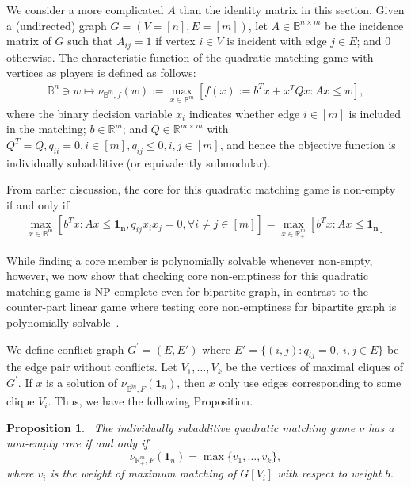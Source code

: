 \documentclass[11pt]{article}\usepackage[]{graphicx}\usepackage[]{xcolor}
\newtheorem{prop}{Proposition}
\begin{document}
We consider a more complicated $A$ than the identity matrix in this section. Given a (undirected) graph $G=(V=[n], E=[m])$, let $A \in \mathbb{B}^{n\times m}$ be the incidence matrix of $G$ such that $A_{ij}=1$ if vertex $i\in V$ is incident with edge $j\in E$; and 0 otherwise. The characteristic function of the quadratic matching game with vertices as players is defined as follows:
\begin{eqnarray*}
\mathbb{B}^n\ni w\mapsto \nu_{\mathbb{B}^m,f}(w):=\max_{x \in \mathbb{B}^m} \left[f(x):=b^T x+x^TQx: Ax\le w\right],
\end{eqnarray*}
where the binary decision variable $x_i$ indicates whether edge $i\in [m]$ is included in the matching; $b\in\mathbb{R}^m$; and $Q\in\mathbb{R}^{m\times m}$ with $Q^T=Q, q_{ii}=0, i\in [m], q_{ij}\le 0, i, j\in [m]$, and hence the objective function is individually subadditive (or equivalently submodular).

From earlier discussion, the core for this quadratic matching game is non-empty if and only if
\begin{eqnarray*}
\max_{x\in\mathbb{B}^m} \left[b^Tx: Ax\le \mathbf{1_n}, q_{ij}x_ix_j=0, \forall i\ne j\in [m]\right]=\max_{x\in\mathbb{R}^m_{+}} \left[b^Tx: Ax\le \mathbf{1_n}\right]
\end{eqnarray*}

While finding a core member is polynomially solvable whenever non-empty, however, we now show that checking core non-emptiness for this quadratic matching game is NP-complete even for bipartite graph, in contrast to the counter-part linear game where testing core non-emptiness for bipartite graph is polynomially solvable~\citep[Corollary 3]{deng1999algorithmic}.

We define conflict graph $G^{\prime}=(E,E')$ where $E'=\{(i,j): q_{ij}=0,~i,j\in E\}$ be the edge pair without conflicts. Let $V_1,\ldots,V_k$ be the vertices of maximal cliques of $G^{\prime}$. If $x$ is a solution of $\nu_{\overline{\mathbb{B}^m},F}\left(\mathbf{1}_n\right)$, then $x$ only use edges corresponding to some clique $V_i$. Thus, we have the following Proposition.

\begin{prop}~\label{prop:q-matching-core}
The individually subadditive quadratic matching game $\nu$ has a non-empty core if and only if
$$
\nu_{\mathbb{R}^m_{+},F}\left(\mathbf{1}_n\right)=\max\{v_1,\ldots,v_k\},
$$
where $v_i$ is the weight of maximum matching of $G[V_i]$ with respect to weight $b$.
\end{prop}
\end{document}
